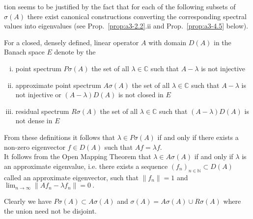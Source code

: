 \newpage

	tion seems to be justified by the fact that for each of the following subsets of $\sigma(A)$ there exist canonical constructions converting the corresponding spectral values into eigenvalues (see Prop.~\ref{prop:a3-2.2}.ii and Prop.~\ref{prop:a3-4.5} below).
	\begin{definition}\label{def:a3-2.1}
		
		For a closed, densely defined, linear operator $A$ with domain $D(A)$ in the Banach space $E$ denote by the
		
		\begin{enumerate}[(i)]
			\item point spectrum $P\sigma(A)$ the set of all $\lambda \in \mathbb{C}$ such that $A - \lambda$ is not injective
			
			\item approximate point spectrum $A\sigma(A)$ the set of all $\lambda \in \mathbb{C}$ such that $A - \lambda$ is not injective or $(A - \lambda)D(A)$ is not closed in $E$
			
			\item residual spectrum $R\sigma(A)$ the set of all $\lambda \in \mathbb{C}$ such that $(A - \lambda)D(A)$ is not dense in $E$
		\end{enumerate}
	\end{definition}
	
	From these definitions it follows that $\lambda \in P\sigma(A)$ if and only if there exists a non-zero eigenvector $f \in D(A)$ such that $Af = \lambda f$.
	\\
	It follows from the Open Mapping Theorem that $\lambda \in A\sigma(A)$ if and only if $\lambda$ is an approximate eigenvalue, i.e. there exists a sequence $(f_{n})_{n \in \mathbb{N}} \subset D(A)$ called an approximate eigenvector, such that $\|f_{n}\| = 1$ and 
	$
	\lim_{n \to \infty} \|Af_{n} - \lambda f_{n}\| = 0~.
    $
	
	
	Clearly we have $P\sigma(A) \subset A\sigma(A)$ and $\sigma(A) = A\sigma(A) \cup R\sigma(A)$ where the union need not be disjoint.
	
